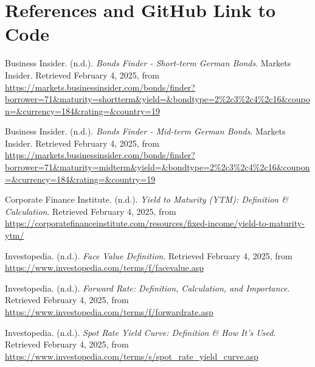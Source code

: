 \documentclass{article}
\begin{document}
\newpage
\section*{References and GitHub Link to Code}
\noindent Business Insider. (n.d.). \textit{Bonds Finder - Short-term German Bonds}. Markets Insider. Retrieved February 4, 2025, from \url{https://markets.businessinsider.com/bonds/finder?borrower=71&maturity=shortterm&yield=&bondtype=2%2c3%2c4%2c16&coupon=&currency=184&rating=&country=19}

\vspace{0.3cm}

\noindent Business Insider. (n.d.). \textit{Bonds Finder - Mid-term German Bonds}. Markets Insider. Retrieved February 4, 2025, from \url{https://markets.businessinsider.com/bonds/finder?borrower=71&maturity=midterm&yield=&bondtype=2%2c3%2c4%2c16&coupon=&currency=184&rating=&country=19}

\vspace{0.3cm}

\noindent Corporate Finance Institute. (n.d.). \textit{Yield to Maturity (YTM): Definition \& Calculation}. Retrieved February 4, 2025, from \url{https://corporatefinanceinstitute.com/resources/fixed-income/yield-to-maturity-ytm/}

\vspace{0.3cm}

\noindent Investopedia. (n.d.). \textit{Face Value Definition}. Retrieved February 4, 2025, from \url{https://www.investopedia.com/terms/f/facevalue.asp}

\vspace{0.3cm}

\noindent Investopedia. (n.d.). \textit{Forward Rate: Definition, Calculation, and Importance}. Retrieved February 4, 2025, from \url{https://www.investopedia.com/terms/f/forwardrate.asp}

\vspace{0.3cm}

\noindent Investopedia. (n.d.). \textit{Spot Rate Yield Curve: Definition \& How It’s Used}. Retrieved February 4, 2025, from \url{https://www.investopedia.com/terms/s/spot_rate_yield_curve.asp}

\vspace{0.3cm}
\end{document}
